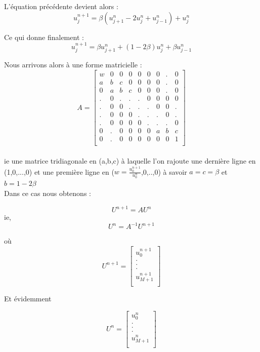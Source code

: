 \documentclass[a4paper, 12pt]{article}
\begin{document}
L'équation précédente devient alors :\\

$$u^{n+1}_j= \beta (u^n_{j+1}-2u^n_j+u^n_{j-1})+u^n_j$$

Ce qui donne finalement : \\

$$u^{n+1}_j= \beta u^n_{j+1} +  (1-2\beta) u^n_j + \beta u^n_{j-1}$$

Nous arrivons alors à une forme matricielle :\\

\[
A =
\left[ {\begin{array}{ccccccccc}

w & 0 & 0 & 0  & 0 & 0 & 0 & . & 0\\ 
a  & b  & c  & 0  & 0  & 0  & 0  & .  & 0 \\ 
0  & a  & b  & c  & 0  & 0  & 0  & .  & 0\\ 
.  & 0  & .  & .  & .  & 0  & 0  & 0  & 0\\ 
.  & 0  & 0  & .  & .  & .  & 0  & 0  & . \\
.  & 0  & 0  & 0  & .  & .  & .  & 0  & . \\
.  & 0  & 0  & 0  & 0  & .  & .  & .  & 0 \\
0  & .  & 0  & 0  & 0  & 0  & a  & b  & c\\ 
0  & .  & 0  & 0  & 0  & 0  & 0  & 0  & 1 \\
\end{array} } \right]
\]
\\

ie une matrice tridiagonale en (a,b,c) à laquelle l'on rajoute une dernière ligne en (1,0,...,0) et une première ligne en ($w=\frac{u^{n+1}_0}{u^n_0}$,0,..,0)
à savoir $a=c=\beta$ et $b=1-2\beta$\\

Dans ce cas nous obtenons : 

$$U^{n+1}=AU^n$$
ie,
$$U^n=A^{-1}U^{n+1}$$

où
\[
U^{n+1} =
\left[ {\begin{array}{c}
        u^{n+1}_0\\
        .\\
        .\\
        .\\
        u^{n+1}_{M+1}\\
\end{array} } \right]
\]
        
Et évidemment 

\[
U^{n} =
\left[ {\begin{array}{c}
        u^{n}_0\\
        .\\
        .\\
        .\\
        u^{n}_{M+1}\\
\end{array} } \right]
\]
\end{document}
